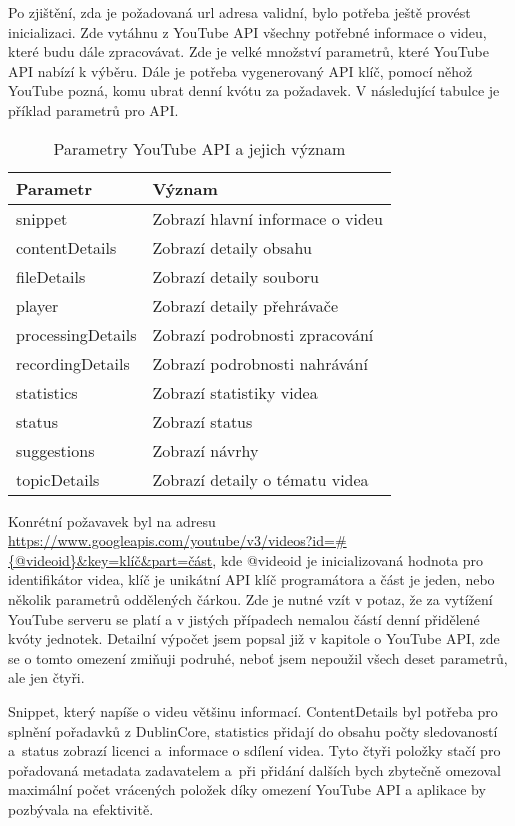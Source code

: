 \par Po zjištění, zda je požadovaná url adresa validní, bylo potřeba ještě provést inicializaci. Zde vytáhnu z YouTube API všechny potřebné informace o videu, které budu dále zpracovávat. Zde je velké množství parametrů, které YouTube API nabízí k výběru. Dále je potřeba vygenerovaný API klíč, pomocí něhož YouTube pozná, komu ubrat denní kvótu za požadavek. V následující tabulce je příklad parametrů pro API.
\begin{table}[h!]
\centering
\caption[Parametry YouTube API a jejich význam]{Parametry YouTube API a jejich význam}\label{tab:apiparams}
\begin{tabular}{| l | l |}
\hline
Parametr & Význam \\
\hline
snippet & Zobrazí hlavní informace o videu \\
\hline
contentDetails & Zobrazí detaily obsahu \\
\hline
fileDetails & Zobrazí detaily souboru \\
\hline
player & Zobrazí detaily přehrávače \\
\hline
processingDetails & Zobrazí podrobnosti zpracování \\
\hline
recordingDetails & Zobrazí podrobnosti nahrávání \\
\hline
statistics & Zobrazí statistiky videa \\
\hline
status & Zobrazí status \\
\hline
suggestions & Zobrazí návrhy \\
\hline
topicDetails & Zobrazí detaily o tématu videa \\
\hline
\end{tabular}
\end{table}

\par Konrétní požavavek byl na adresu \url{https://www.googleapis.com/youtube/v3/videos?id=#{@videoid}&key=klíč&part=část}, kde @videoid je inicializovaná hodnota pro identifikátor videa, klíč je unikátní API klíč programátora a část je jeden, nebo několik parametrů oddělených čárkou. Zde je nutné vzít v potaz, že za vytížení YouTube serveru se platí a v jistých případech nemalou částí denní přidělené kvóty jednotek. Detailní výpočet jsem popsal již v kapitole o YouTube API, zde se o tomto omezení zmiňuji podruhé, neboť jsem nepoužil všech deset parametrů, ale jen čtyři.
\par Snippet, který napíše o videu většinu informací. ContentDetails byl potřeba pro splnění pořadavků z DublinCore, statistics přidají do obsahu počty sledovaností a~status zobrazí licenci a~informace o sdílení videa. Tyto čtyři položky stačí pro pořadovaná metadata zadavatelem a~při přidání dalších bych zbytečně omezoval maximální počet vrácených položek díky omezení YouTube API a aplikace by pozbývala na efektivitě.

